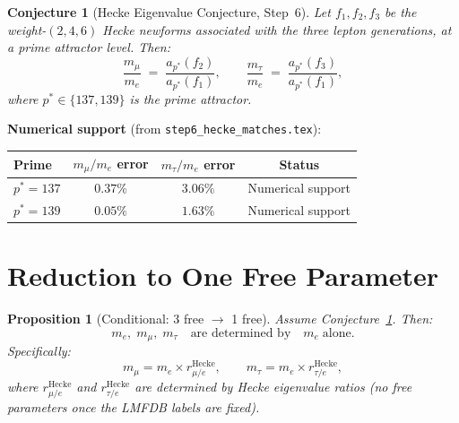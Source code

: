 \documentclass[12pt,a4paper]{article}
\newtheorem{proposition}[theorem]{Proposition}
\newtheorem{conjecture}[theorem]{Conjecture}
\theoremstyle{definition}
\theoremstyle{remark}
\begin{document}
\begin{conjecture}[Hecke Eigenvalue Conjecture, Step~6]
\label{conj:hecke}
Let $f_1, f_2, f_3$ be the weight-$(2, 4, 6)$ Hecke newforms associated
with the three lepton generations, at a prime attractor level.  Then:
\begin{equation}
  \frac{m_\mu}{m_e} \;=\; \frac{a_{p^*}(f_2)}{a_{p^*}(f_1)}, \qquad
  \frac{m_\tau}{m_e} \;=\; \frac{a_{p^*}(f_3)}{a_{p^*}(f_1)},
\end{equation}
where $p^* \in \{137, 139\}$ is the prime attractor.
\end{conjecture}

\textbf{Numerical support} (from \texttt{step6\_hecke\_matches.tex}):
\begin{center}
\begin{tabular}{lccc}
  \toprule
  Prime & $m_\mu/m_e$ error & $m_\tau/m_e$ error & Status \\
  \midrule
  $p^* = 137$ & $0.37\%$ & $3.06\%$ & Numerical support \\
  $p^* = 139$ & $0.05\%$ & $1.63\%$ & Numerical support \\
  \bottomrule
\end{tabular}
\end{center}

\section{Reduction to One Free Parameter}
\label{sec:reduction}

\begin{proposition}[Conditional: 3 free $\to$ 1 free]
\label{prop:reduction}
Assume Conjecture~\ref{conj:hecke}.  Then:
\begin{equation}
  m_e, \; m_\mu, \; m_\tau
  \quad\text{are determined by}\quad
  m_e \;\text{alone.}
\end{equation}
Specifically:
\begin{equation}
  m_\mu = m_e \times r_{\mu/e}^{\mathrm{Hecke}}, \qquad
  m_\tau = m_e \times r_{\tau/e}^{\mathrm{Hecke}},
\end{equation}
where $r_{\mu/e}^{\mathrm{Hecke}}$ and $r_{\tau/e}^{\mathrm{Hecke}}$
are determined by Hecke eigenvalue ratios (no free parameters once the
LMFDB labels are fixed).
\end{proposition}
\end{document}
